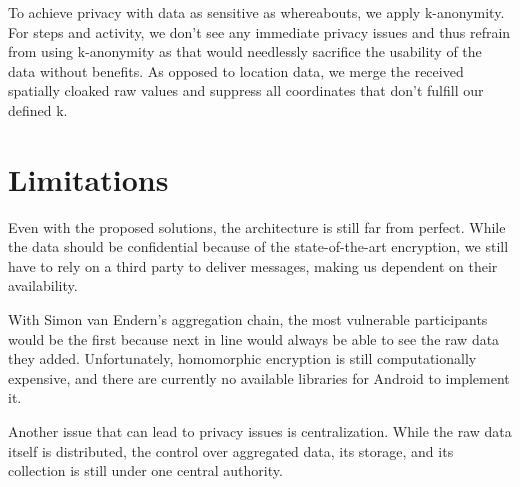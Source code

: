 To achieve privacy with data as sensitive as whereabouts, we apply k-anonymity. For steps and activity, we don't see any immediate privacy issues and thus refrain from using k-anonymity as that would needlessly sacrifice the usability of the data without benefits. As opposed to location data, we merge the received spatially cloaked raw values and suppress all coordinates that don't fulfill our defined k. 

\section{Limitations}
Even with the proposed solutions, the architecture is still far from perfect. While the data should be confidential because of the state-of-the-art encryption, we still have to rely on a third party to deliver messages, making us dependent on their availability.

With Simon van Endern's aggregation chain, the most vulnerable participants would be the first because next in line would always be able to see the raw data they added. Unfortunately, homomorphic encryption is still computationally expensive, and there are currently no available libraries for Android to implement it.

Another issue that can lead to privacy issues is centralization. While the raw data itself is distributed, the control over aggregated data, its storage, and its collection is still under one central authority.